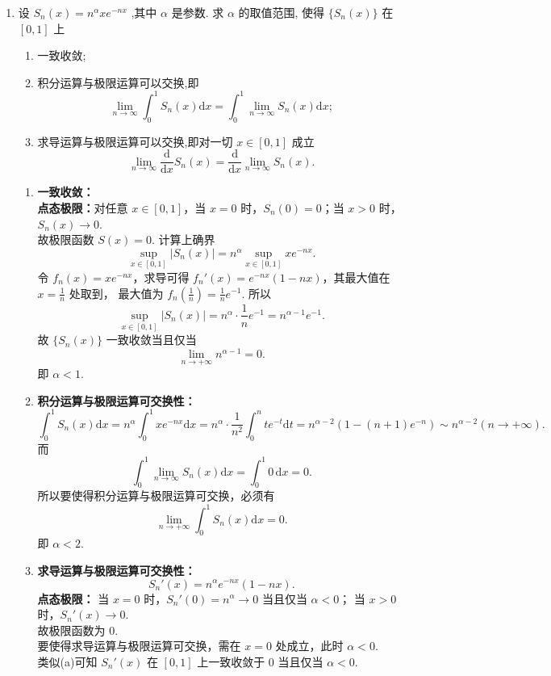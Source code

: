 \begin{enumerate}
    \item[5.]设 \(\displaystyle S_{n}(x) = n^{\alpha}x e^{-n x}\) ,其中 \(\alpha\) 是参数.
    求 \(\alpha\) 的取值范围, 使得 \(\displaystyle \{S_{n}(x)\}\) 在 \([0,1]\) 上
    \begin{enumerate}
        \item[(a)]一致收敛;
        \item[(b)]积分运算与极限运算可以交换,即
        \[\displaystyle \lim_{n\to \infty}\int_{0}^{1}S_{n}(x)\mathrm{d}x = \int_{0}^{1}\lim_{n\to \infty}S_{n}(x)\mathrm{d}x;\]
        \item[(c)]求导运算与极限运算可以交换,即对一切 \(\displaystyle x\in [0,1]\) 成立
        \[\displaystyle \lim_{n\to \infty}\frac{\mathrm{d}}{\mathrm{d}x} S_{n}(x) = \frac{\mathrm{d}}{\mathrm{d}x}\lim_{n\to \infty}S_{n}(x).\]
    \end{enumerate}
    \begin{solution}
        \begin{enumerate}
        \item \textbf{一致收敛：}\\
        \textbf{点态极限：}对任意 $x\in[0,1]$，当 $x=0$ 时，$S_n(0)=0$；当 $x>0$ 时，$S_n(x)\to 0$.\\
        故极限函数 $S(x)=0$. 计算上确界
        \[
        \sup_{x\in[0,1]} |S_n(x)| = n^\alpha \sup_{x\in[0,1]} x e^{-nx}.
        \]
        令 $\displaystyle f_n(x)=x e^{-nx}$，求导可得 $\displaystyle f_n'(x)=e^{-nx}(1-nx)$，其最大值在 $\displaystyle x=\frac{1}{n}$ 处取到，
        最大值为 $\displaystyle f_n(\frac{1}{n})=\frac{1}{n}e^{-1}$. 所以
        \[
        \sup_{x\in[0,1]} |S_n(x)| = n^\alpha \cdot \frac{1}{n}e^{-1} = n^{\alpha-1}e^{-1}.
        \]
        故 $\{S_n(x)\}$ 一致收敛当且仅当 
        \[
        \lim_{n\to+\infty} n^{\alpha-1}=0.
        \]
        即 $\alpha<1$.
        \item \textbf{积分运算与极限运算可交换性：}
        \[
        \int_0^1 S_n(x) \mathrm{d}x = n^\alpha \int_0^1 x e^{-nx} \mathrm{d}x = n^\alpha \cdot \frac{1}{n^2} \int_0^n t e^{-t} \mathrm{d}t = n^{\alpha-2} \left(1-(n+1)e^{-n}\right) \sim n^{\alpha-2}(n\to+\infty).
        \]
        而 
        \[
        \int_0^1 \lim_{n\to\infty} S_n(x) \mathrm{d}x = \int_0^1 0 \, \mathrm{d}x = 0.
        \]
        所以要使得积分运算与极限运算可交换，必须有 
        \[
        \lim_{n\to+\infty} \int_0^1 S_n(x) \mathrm{d}x = 0.
        \]
        即 $\alpha<2$.
        \item \textbf{求导运算与极限运算可交换性：}
        \[
        S_n'(x) = n^\alpha e^{-nx}(1-nx).
        \]
        \textbf{点态极限：}
        当 $x=0$ 时，$S_n'(0)=n^\alpha \to 0$ 当且仅当 $\alpha<0$；
        当 $x>0$ 时，$S_n'(x)\to 0$.\\
        故极限函数为 0.\\
        要使得求导运算与极限运算可交换，需在 $x=0$ 处成立，此时 $\alpha<0$.\\
        类似(a)可知 $S_n'(x)$ 在 $[0,1]$ 上一致收敛于 0 当且仅当 $\alpha<0$.
        \end{enumerate}
    \end{solution}


\end{enumerate}
